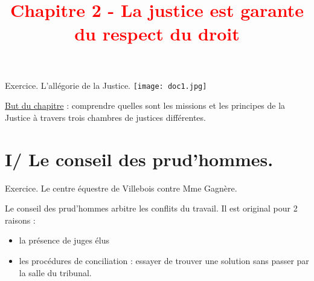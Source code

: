 \documentclass{beamer}
\title{{\textcolor{red}{Chapitre 2 - La justice est garante du respect du droit}}}
\begin{document}
\begin{frame}
 \titlepage %
 \end{frame}

 
 \begin{frame}
 \tableofcontents
 \end{frame}
 
 \begin{frame}{Exercice. L'allégorie de la Justice.}
\texttt{[image: doc1.jpg]}
 \end{frame}
 
 \begin{frame}
 \underline{But du chapitre} : comprendre quelles sont les missions et les principes de la Justice à travers trois chambres de justices différentes.
 \end{frame}
 
 \section{I/ Le conseil des prud'hommes.}
 
 \begin{frame}{Exercice. Le centre équestre de Villebois contre Mme Gagnère.}
 
 \end{frame}
 
 
 \begin{frame}
 Le conseil des prud'hommes arbitre les conflits du travail. Il est original pour 2 raisons : 
 \begin{itemize}
 \item la présence de juges élus
 \item les procédures de conciliation : essayer de trouver une solution sans passer par la salle du tribunal.
 \end{itemize}
 \end{frame}
 
 
 
\end{document}
